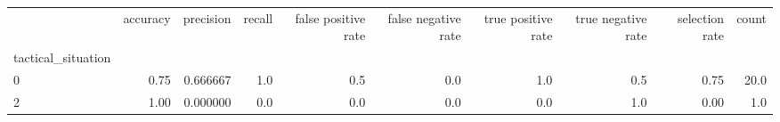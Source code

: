 \begin{tabular}{lrrrrrrrrr}
\toprule
{} &  accuracy &  precision &  recall &  false positive rate &  false negative rate &  true positive rate &  true negative rate &  selection rate &  count \\
tactical\_situation &           &            &         &                      &                      &                     &                     &                 &        \\
\midrule
0                  &      0.75 &   0.666667 &     1.0 &                  0.5 &                  0.0 &                 1.0 &                 0.5 &            0.75 &   20.0 \\
2                  &      1.00 &   0.000000 &     0.0 &                  0.0 &                  0.0 &                 0.0 &                 1.0 &            0.00 &    1.0 \\
\bottomrule
\end{tabular}
